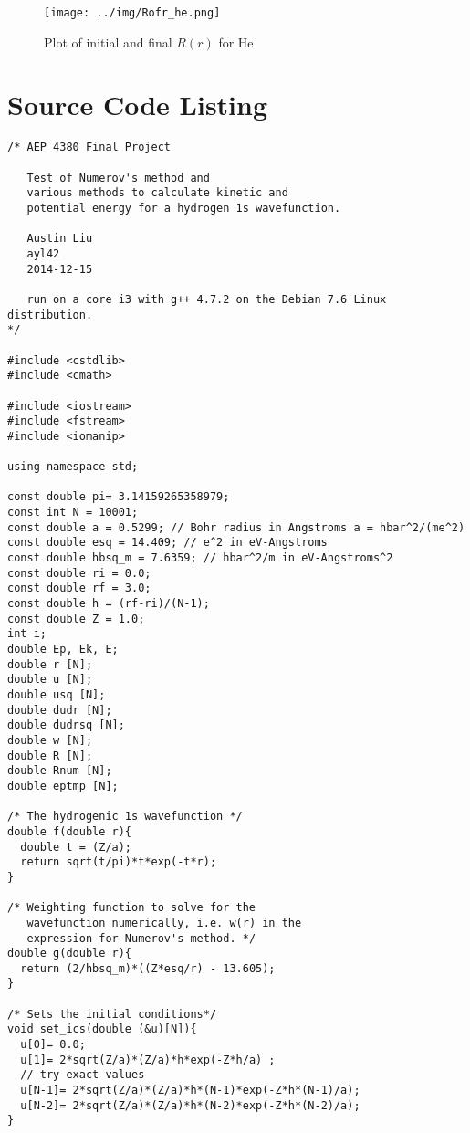 \documentclass[11pt,letterpaper]{article}
\begin{document}
\begin{figure}[h!]
\begin{center}
\texttt{[image: ../img/Rofr\_he.png]}
\end{center}
\caption{Plot of initial and final $R(r)$ for He
\label{Rofrhe}}
\end{figure}


\pagebreak
\pagebreak
\pagebreak
\printbibliography[heading=none]

\appendix
\section{Source Code Listing}
\begin{verbatim}
/* AEP 4380 Final Project

   Test of Numerov's method and
   various methods to calculate kinetic and
   potential energy for a hydrogen 1s wavefunction.

   Austin Liu
   ayl42
   2014-12-15

   run on a core i3 with g++ 4.7.2 on the Debian 7.6 Linux distribution.
*/

#include <cstdlib>
#include <cmath>

#include <iostream>
#include <fstream>
#include <iomanip>

using namespace std;

const double pi= 3.14159265358979;
const int N = 10001;
const double a = 0.5299; // Bohr radius in Angstroms a = hbar^2/(me^2)
const double esq = 14.409; // e^2 in eV-Angstroms
const double hbsq_m = 7.6359; // hbar^2/m in eV-Angstroms^2
const double ri = 0.0;
const double rf = 3.0;
const double h = (rf-ri)/(N-1);
const double Z = 1.0;
int i;
double Ep, Ek, E;
double r [N];
double u [N];
double usq [N];
double dudr [N];
double dudrsq [N];
double w [N];
double R [N];
double Rnum [N];
double eptmp [N];
  
/* The hydrogenic 1s wavefunction */
double f(double r){
  double t = (Z/a);
  return sqrt(t/pi)*t*exp(-t*r);
}

/* Weighting function to solve for the
   wavefunction numerically, i.e. w(r) in the 
   expression for Numerov's method. */
double g(double r){
  return (2/hbsq_m)*((Z*esq/r) - 13.605);   
}

/* Sets the initial conditions*/
void set_ics(double (&u)[N]){
  u[0]= 0.0;
  u[1]= 2*sqrt(Z/a)*(Z/a)*h*exp(-Z*h/a) ; 
  // try exact values
  u[N-1]= 2*sqrt(Z/a)*(Z/a)*h*(N-1)*exp(-Z*h*(N-1)/a);
  u[N-2]= 2*sqrt(Z/a)*(Z/a)*h*(N-2)*exp(-Z*h*(N-2)/a);
}


\end{verbatim}
\end{document}
